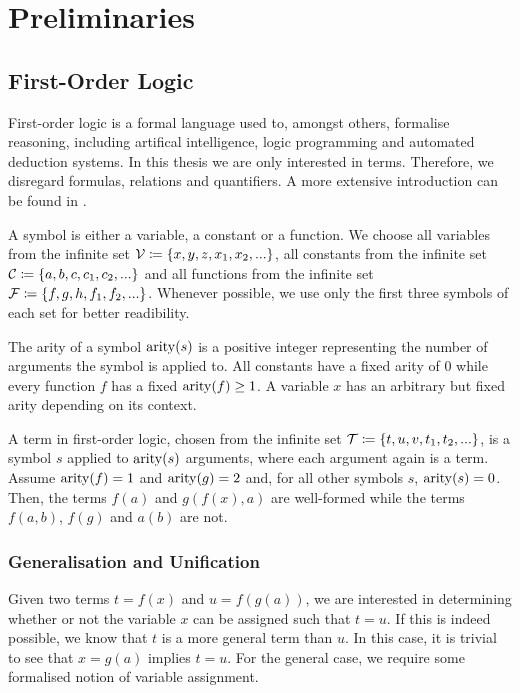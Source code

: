 \chapter{Preliminaries}
\section{First-Order Logic}
First-order logic is a formal language used to, amongst others, formalise reasoning, including artifical intelligence, logic programming and automated deduction systems. In this thesis we are only interested in terms. Therefore, we disregard formulas, relations and quantifiers. A more extensive introduction can be found in \cite{abiteboul_foundations_1995}.

A symbol is either a variable, a constant or a function. We choose all variables from the infinite set $\mathcal{V} \coloneqq \{x, y, z, x_{1}, x_{2}, ...\}$, all constants from the infinite set $\mathcal{C} \coloneqq \{a, b, c, c_{1}, c_{2}, ...\}$ and all functions from the infinite set $\mathcal{F} \coloneqq \{f, g, h, f_{1}, f_{2}, ...\}$. Whenever possible, we use only the first three symbols of each set for better readibility.

The arity of a symbol $\mathrm{arity}(s)$ is a positive integer representing the number of arguments the symbol is applied to. All constants have a fixed arity of $0$ while every function $f$ has a fixed $\mathrm{arity}(f) \geq 1$. A variable $x$ has an arbitrary but fixed arity depending on its context.

A term in first-order logic, chosen from the infinite set $\mathcal{T} \coloneqq \{t, u, v, t_{1}, t_{2}, ...\}$, is a symbol $s$ applied to $\mathrm{arity}(s)$ arguments, where each argument again is a term. Assume $\mathrm{arity}(f) = 1$ and $\mathrm{arity}(g) = 2$ and, for all other symbols $s$, $\mathrm{arity}(s) = 0$. Then, the terms $f(a)$ and $g(f(x), a)$ are well-formed while the terms $f(a,b)$, $f(g)$ and $a(b)$ are not.

\subsection{Generalisation and Unification}
Given two terms $t = f(x)$ and $u = f(g(a))$, we are interested in determining whether or not the variable $x$ can be assigned such that $t = u$. If this is indeed possible, we know that $t$ is a more general term than $u$. In this case, it is trivial to see that $x = g(a)$ implies $t = u$. For the general case, we require some formalised notion of variable assignment.

